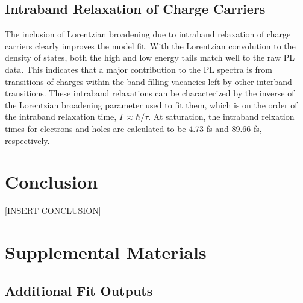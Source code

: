 \documentclass[aps,prl,preprint,superscriptaddress]{revtex4-2}
\begin{document}
\subsection{Intraband Relaxation of Charge Carriers}

The inclusion of Lorentzian broadening due to intraband relaxation of charge carriers clearly improves the model fit. With the Lorentzian convolution to the density of states, both the high and low energy tails match well to the raw PL data. This indicates that a major contribution to the PL spectra is from transitions of charges within the band filling vacancies left by other interband transitions. These intraband relaxations can be characterized by the inverse of the Lorentzian broadening parameter used to fit them, which is on the order of the intraband relaxation time, $\Gamma \approx \hbar/\tau$. At saturation, the intraband relxation times for electrons and holes are calculated to be 4.73 fs and 89.66 fs, respectively.





\section{Conclusion}


[INSERT CONCLUSION]



\clearpage

\section{Supplemental Materials}

\subsection{Additional Fit Outputs}
\end{document}
